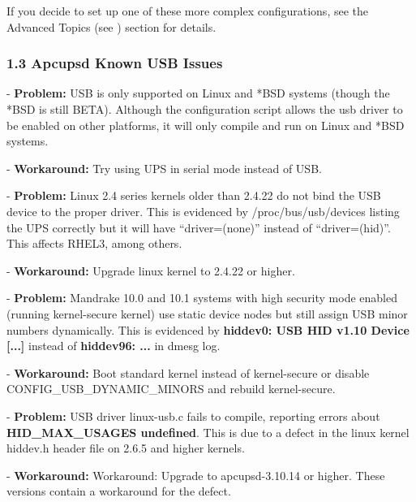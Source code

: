 \footnotesize
\begin{verbatim}
\end{verbatim}
\normalsize

If you decide to set up one of these more complex configurations, see the
Advanced Topics (see 
) section for details. 

\label{Apcupsd-Known-USB-Issues}

\subsubsection*{1.3 Apcupsd Known USB Issues}

\label{index-USB-problems-15}
\label{index-Problems_002c-USB-16}
- {\bf Problem:} USB is only supported on Linux and *BSD systems (though the
*BSD is still BETA). Although the configuration script allows the usb driver
to be enabled on other platforms, it will only compile and run on Linux and
*BSD systems.  

- {\bf Workaround:} Try using UPS in serial mode instead of USB.  

- {\bf Problem:} Linux 2.4 series kernels older than 2.4.22 do not bind the
USB device to the proper driver. This is evidenced by /proc/bus/usb/devices
listing the UPS correctly but it will have ``driver=(none)'' instead of
``driver=(hid)''. This affects RHEL3, among others.  

- {\bf Workaround:} Upgrade linux kernel to 2.4.22 or higher.  

- {\bf Problem:} Mandrake 10.0 and 10.1 systems with high security mode
enabled (running kernel-secure kernel) use static device nodes but still
assign USB minor numbers dynamically. This is evidenced by {\bf hiddev0: USB
HID v1.10 Device [...]} instead of {\bf hiddev96: ...} in dmesg log.  

- {\bf Workaround:} Boot standard kernel instead of kernel-secure or disable
CONFIG\_USB\_DYNAMIC\_MINORS and rebuild kernel-secure.  

- {\bf Problem:} USB driver linux-usb.c fails to compile, reporting errors
about {\bf HID\_MAX\_USAGES undefined}. This is due to a defect in the linux
kernel hiddev.h header file on 2.6.5 and higher kernels.  

- {\bf Workaround:} Workaround: Upgrade to apcupsd-3.10.14 or higher.  These
versions contain a workaround for the defect.  


